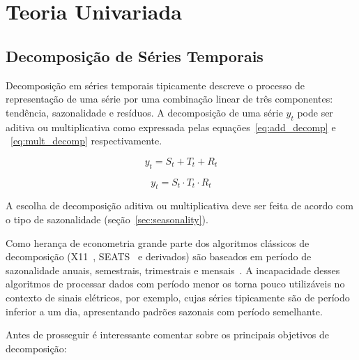 \chapter{Teoria Univariada}
\label{chap:univariate_theory}

\section{Decomposição de Séries Temporais}
\label{sec:decomposition}

Decomposição em séries temporais tipicamente descreve o processo de
representação de uma série por uma combinação linear de três componentes:
tendência, sazonalidade e resíduos. A decomposição de uma série $y_t$ pode ser
aditiva ou multiplicativa como expressada pelas equações~\ref{eq:add_decomp} e
~\ref{eq:mult_decomp} respectivamente.

\begin{equation}\label{eq:add_decomp}
    y_t = S_t + T_t + R_t
\end{equation}

\begin{equation}\label{eq:mult_decomp}
    y_t = S_t \cdot T_t \cdot R_t
\end{equation}

A escolha de decomposição aditiva ou multiplicativa deve ser feita de acordo
com o tipo de sazonalidade (seção~\ref{sec:seasonality}).

Como herança de econometria grande parte dos algoritmos clássicos de
decomposição (X11~\cite{x11}, SEATS~\cite[capítulo~5.2]{SEATS} e derivados) são
baseados em período de sazonalidade anuais, semestrais, trimestrais e
mensais~\cite{athana}. A incapacidade desses algoritmos de processar dados com
período menor os torna pouco utilizáveis no contexto de sinais elétricos, por
exemplo, cujas séries tipicamente são de período inferior a um dia,
apresentando padrões sazonais com período semelhante.

Antes de prosseguir é interessante comentar sobre os principais objetivos de
decomposição:

